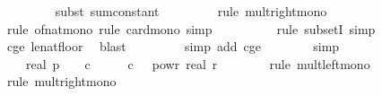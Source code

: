 \begin{isabellebody}
\ \ \ \ \ \ \ \isamarkupfalse%
\ {\isacharparenleft}{\kern0pt}subst\ sum{\isacharunderscore}{\kern0pt}constant{\isacharparenright}{\kern0pt}\isanewline
\ \ \ \ \ \ \ \isamarkupfalse%
\ {\isacharparenleft}{\kern0pt}rule\ mult{\isacharunderscore}{\kern0pt}right{\isacharunderscore}{\kern0pt}mono{\isacharparenright}{\kern0pt}\isanewline
\ \ \ \ \ \ \ \ \isamarkupfalse%
\ {\isacharparenleft}{\kern0pt}rule\ of{\isacharunderscore}{\kern0pt}nat{\isacharunderscore}{\kern0pt}mono{\isacharcomma}{\kern0pt}\ rule\ card{\isacharunderscore}{\kern0pt}mono{\isacharcomma}{\kern0pt}\ simp{\isacharparenright}{\kern0pt}\isanewline
\ \ \ \ \ \ \ \ \isamarkupfalse%
\ {\isacharparenleft}{\kern0pt}rule\ subsetI{\isacharcomma}{\kern0pt}\ simp{\isacharparenright}{\kern0pt}\ \isamarkupfalse%
\ c{\isacharunderscore}{\kern0pt}ge{\isacharunderscore}{\kern0pt}{}\ le{\isacharunderscore}{\kern0pt}nat{\isacharunderscore}{\kern0pt}floor\ \isamarkupfalse%
\ blast\isanewline
\ \ \ \ \ \ \ \isamarkupfalse%
\ {\isacharparenleft}{\kern0pt}simp\ add{\isacharcolon}{\kern0pt}\ c{\isacharunderscore}{\kern0pt}ge{\isacharunderscore}{\kern0pt}{}{\isacharparenright}{\kern0pt}\isanewline
\ \ \ \ \ \ \isamarkupfalse%
\ simp\isanewline
\ \ \ \ \isamarkupfalse%
\ \isamarkupfalse%
\ {\isachardoublequoteopen}{\isachardot}{\kern0pt}{\isachardot}{\kern0pt}{\isachardot}{\kern0pt}\ {\isasymle}\ \ {}{\isacharslash}{\kern0pt}{\isacharparenleft}{\kern0pt}real\ p{\isacharparenright}{\kern0pt}\ {\isacharasterisk}{\kern0pt}\ {\isacharparenleft}{\kern0pt}{\isacharparenleft}{\kern0pt}{}\ {\isacharasterisk}{\kern0pt}\ c{\isacharparenright}{\kern0pt}\ {\isacharasterisk}{\kern0pt}\ {\isacharparenleft}{\kern0pt}{}\ {\isacharasterisk}{\kern0pt}\ {\isacharparenleft}{\kern0pt}{}\ {\isacharasterisk}{\kern0pt}\ c\ {\isacharasterisk}{\kern0pt}\ {}\ powr\ {\isacharparenleft}{\kern0pt}{\isacharminus}{\kern0pt}real\ r{\isacharparenright}{\kern0pt}{\isacharparenright}{\kern0pt}{\isacharparenright}{\kern0pt}{\isacharparenright}{\kern0pt}{\isachardoublequoteclose}\isanewline
\ \ \ \ \ \ \isamarkupfalse%
\ {\isacharparenleft}{\kern0pt}rule\ mult{\isacharunderscore}{\kern0pt}left{\isacharunderscore}{\kern0pt}mono{\isacharparenright}{\kern0pt}\isanewline
\ \ \ \ \ \ \ \isamarkupfalse%
\ {\isacharparenleft}{\kern0pt}rule\ mult{\isacharunderscore}{\kern0pt}right{\isacharunderscore}{\kern0pt}mono{\isacharparenright}{\kern0pt}\isanewline

\end{isabellebody}
